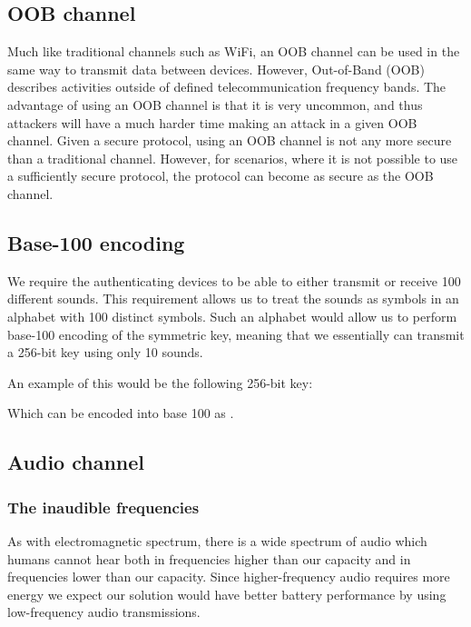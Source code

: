 \documentclass[12pt]{article}
\begin{document}
\subsection{OOB channel}

Much like traditional channels such as WiFi, an OOB channel can be used in the same way to transmit data between devices. However, Out-of-Band (OOB) describes activities outside of defined telecommunication frequency bands. The advantage of using an OOB channel is that it is very uncommon, and thus attackers will have a much harder time making an attack in a given OOB channel. Given a secure protocol, using an OOB channel is not any more secure than a traditional channel. However, for scenarios, where it is not possible to use a sufficiently secure protocol, the protocol can become as secure as the OOB channel.

\subsection{Base-100 encoding}

We require the authenticating devices to be able to either transmit or receive 100 different sounds. This requirement allows us to treat the sounds as symbols in an alphabet with 100 distinct symbols. Such an alphabet would allow us to perform base-100 encoding of the symmetric key, meaning that we essentially can transmit a 256-bit key using only 10 sounds.

An example of this would be the following 256-bit key:


Which can be encoded into base 100 as .

\subsection{Audio channel}

\subsubsection{The inaudible frequencies}
\label{subs:The inaudible frequencies}

As with electromagnetic spectrum, there is a wide spectrum of audio which humans cannot hear both in frequencies higher than our capacity and in frequencies lower than our capacity. Since higher-frequency audio requires more energy we expect our solution would have better battery performance by using low-frequency audio transmissions.
\end{document}
